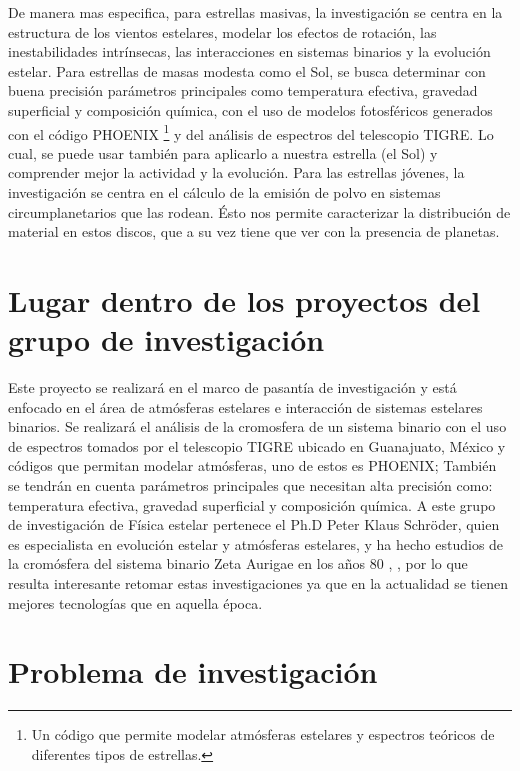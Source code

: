 \documentclass[11pt]{article}
\begin{document}
\noindent De manera mas especifica, para estrellas masivas, la investigación se centra en la estructura de los vientos estelares, modelar los efectos de rotación, las inestabilidades intrínsecas, las interacciones en sistemas binarios y la evolución estelar. Para estrellas de masas modesta como el Sol, se busca determinar con buena precisión parámetros principales como temperatura efectiva, gravedad superficial y composición química, con el uso de modelos fotosféricos generados con el código PHOENIX \cite{hauschildt2005cool} \footnote{Un código que permite modelar atmósferas estelares y espectros teóricos de diferentes tipos de estrellas.} y del análisis de espectros del telescopio TIGRE. Lo cual, se puede usar también para aplicarlo a nuestra estrella (el Sol) y comprender mejor la actividad y la evolución. Para las estrellas jóvenes, la investigación se centra en el cálculo de la emisión de polvo en sistemas circumplanetarios que las rodean. Ésto nos permite caracterizar la distribución de material en estos discos, que a su vez tiene que ver con la presencia de planetas. 

\section{Lugar dentro de los proyectos del grupo de investigación}
\noindent Este proyecto se realizará en el marco de pasantía de investigación y está enfocado en el área de atmósferas estelares e interacción de sistemas estelares binarios. Se realizará el análisis de la cromosfera de un sistema binario con el uso de espectros tomados por el telescopio TIGRE ubicado en Guanajuato, México y códigos que permitan modelar atmósferas, uno de estos es PHOENIX; También se tendrán en cuenta parámetros principales que necesitan alta precisión como: temperatura efectiva, gravedad superficial y composición química. A este grupo de investigación de Física estelar pertenece el Ph.D Peter Klaus Schröder, quien es especialista en evolución estelar y atmósferas estelares, y ha hecho estudios de la cromósfera del sistema binario Zeta Aurigae en los años 80 \cite{kps9}, \cite{kps1O}, por lo que resulta interesante retomar estas investigaciones ya que en la actualidad se tienen mejores tecnologías que en aquella época.

\section{Problema de investigación}
\end{document}
